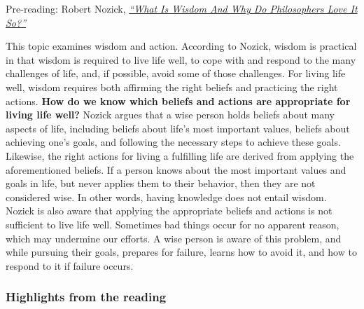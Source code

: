 \documentclass[
]{book}
\begin{document}
\begin{reflect}
Pre-reading: Robert Nozick, \href{assets/u1/PAT_10018662_What_is_Wisdom.pdf}{\emph{``What Is Wisdom And Why Do Philosophers Love It So?''}}
\end{reflect}

This topic examines wisdom and action. According to Nozick, wisdom is practical in that wisdom is required to live life well, to cope with and respond to the many challenges of life, and, if possible, avoid some of those challenges. For living life well, wisdom requires both affirming the right beliefs and practicing the right actions. \textbf{How do we know which beliefs and actions are appropriate for living life well?} Nozick argues that a wise person holds beliefs about many aspects of life, including beliefs about life's most important values, beliefs about achieving one's goals, and following the necessary steps to achieve these goals. Likewise, the right actions for living a fulfilling life are derived from applying the aforementioned beliefs. If a person knows about the most important values and goals in life, but never applies them to their behavior, then they are not considered wise. In other words, having knowledge does not entail wisdom. Nozick is also aware that applying the appropriate beliefs and actions is not sufficient to live life well. Sometimes bad things occur for no apparent reason, which may undermine our efforts. A wise person is aware of this problem, and while pursuing their goals, prepares for failure, learns how to avoid it, and how to respond to it if failure occurs.

\hypertarget{highlights-from-the-reading}{%
\subsubsection*{Highlights from the reading}\label{highlights-from-the-reading}}
\end{document}
